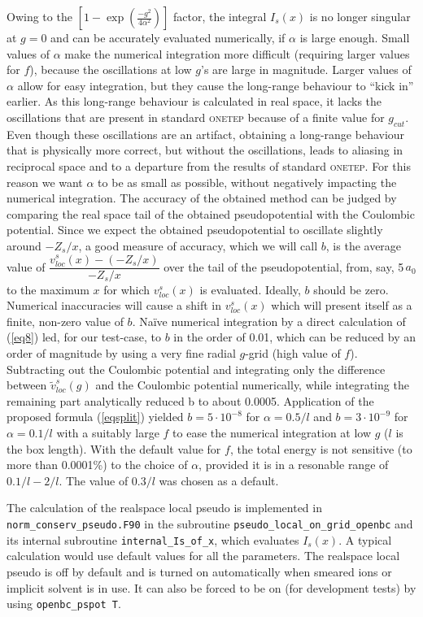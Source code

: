 \documentclass[a4paper,oneside,11pt]{article}
\newcommand{\onetep}{\textsc{onetep}}
\newcommand{\vlocxs}{v^s_{loc}\left(x\right)}
\newcommand{\vlocgs}{\tilde{v}^s_{loc}\left(g\right)}
\begin{document}
Owing to the $\left[1-\exp{\left(\frac{-g^2}{4\alpha^2}\right)}\right]$ factor, the integral $I_s(x)$ is no longer singular at $g=0$ and can be accurately evaluated numerically, if $\alpha$ is large enough. Small values of $\alpha$ make the numerical integration more difficult (requiring larger values for $f$), because the oscillations at low $g$'s are large in magnitude. Larger values of $\alpha$ allow for easy integration, but they cause the long-range behaviour to ``kick in'' earlier. As this long-range behaviour is calculated in real space, it lacks the oscillations that are present in standard \onetep{} because of a finite value for $g_{cut}$. Even though these oscillations are an artifact, obtaining a long-range behaviour that is physically more correct, but without the oscillations, leads to aliasing in reciprocal space and to a departure from the results of standard \onetep{}. For this reason we want $\alpha$ to be as small as possible, without negatively impacting the numerical integration. The accuracy of the obtained method can be judged by comparing the real space tail of the obtained pseudopotential with the Coulombic potential. Since we expect the obtained pseudopotential to oscillate slightly around $-Z_s/x$, a good measure of accuracy, which we will call $b$, is the average value of $\dfrac{\vlocxs-(-Z_s/x)}{-Z_s/x}$ over the tail of the pseudopotential, from, say, 5\,$a_0$ to the maximum $x$ for which $\vlocxs$ is evaluated. Ideally, $b$ should be zero. Numerical inaccuracies will cause a shift in $\vlocxs$ which will present itself as a finite, non-zero value of $b$. Na\"{i}ve numerical integration by a direct calculation of (\ref{eq8}) led, for our test-case, to $b$ in the order of 0.01, which can be reduced by an order of magnitude by using a very fine radial $g$-grid (high value of $f$). Subtracting out the Coulombic potential and integrating only the difference between $\vlocgs$ and the Coulombic potential numerically, while integrating the remaining part analytically reduced b to about 0.0005. Application of the proposed formula (\ref{eqsplit}) yielded $b=5\cdot10^{-8}$ for $\alpha=0.5/l$ and $b=3\cdot10^{-9}$ for $\alpha=0.1/l$ with a suitably large $f$ to ease the numerical integration at low $g$ ($l$ is the box length). With the default value for $f$, the total energy is not sensitive (to more than 0.0001\%) to the choice of $\alpha$, provided it is in a resonable range of $0.1/l - 2/l$. The value of $0.3/l$ was chosen as a default.

The calculation of the realspace local pseudo is implemented in \texttt{norm\_conserv\_pseudo.F90} in the subroutine \texttt{pseudo\_local\_on\_grid\_openbc} and its internal subroutine \texttt{internal\_Is\_of\_x}, which evaluates $I_s(x)$. A typical calculation would use default values for all the parameters. The realspace local pseudo is off by default and is turned on automatically when smeared ions or implicit solvent is in use. It can also be forced to be on (for development tests) by using \texttt{openbc\_pspot T}.
\end{document}
